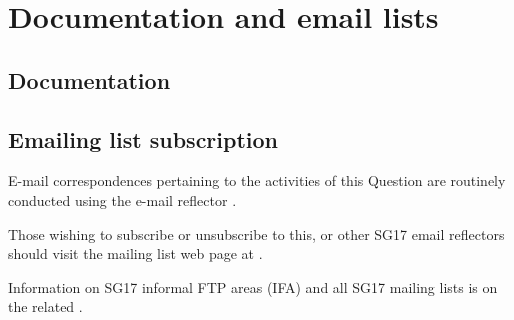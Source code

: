 \section{Documentation and email lists}

\subsection{Documentation}


\documentation

\subsection{Emailing list subscription}

E-mail correspondences pertaining to the activities of this Question are routinely conducted using the e-mail reflector .

Those wishing to subscribe or unsubscribe to this, or other SG17 email reflectors should visit the mailing list web page at {\subUrl}.

Information on SG17 informal FTP areas (IFA) and all SG17 mailing lists is on the related {\ifaUrl}.
